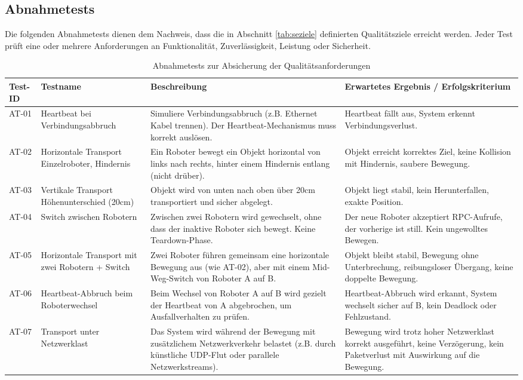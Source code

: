 \subsection{Abnahmetests}

Die folgenden Abnahmetests dienen dem Nachweis, dass die in Abschnitt \ref{tab:seziele} definierten Qualitätsziele erreicht werden. Jeder Test prüft eine oder mehrere Anforderungen an Funktionalität, Zuverlässigkeit, Leistung oder Sicherheit.

\begin{table}[h!]
\centering
\begin{tabular}{p{1.6cm}|p{4cm}|p{5.5cm}|p{5.5cm}}
\hline
\textbf{Test-ID} & \textbf{Testname} & \textbf{Beschreibung} & \textbf{Erwartetes Ergebnis / Erfolgskriterium} \\
\hline
AT-01 & Heartbeat bei Verbindungsabbruch & Simuliere Verbindungsabbruch (z.B. Ethernet Kabel trennen). Der Heartbeat-Mechanismus muss korrekt auslösen. & Heartbeat fällt aus, System erkennt Verbindungsverlust.\\
\hline
AT-02 & Horizontale Transport Einzelroboter, Hindernis & Ein Roboter bewegt ein Objekt horizontal von links nach rechts, hinter einem Hindernis entlang (nicht drüber). & Objekt erreicht korrektes Ziel, keine Kollision mit Hindernis, saubere Bewegung. \\
\hline
AT-03 & Vertikale Transport  Höhenunterschied (20cm) & Objekt wird von unten nach oben über 20cm transportiert und sicher abgelegt. & Objekt liegt stabil, kein Herunterfallen, exakte Position. \\
\hline
AT-04 & Switch zwischen Robotern & Zwischen zwei Robotern wird gewechselt, ohne dass der inaktive Roboter sich bewegt. Keine Teardown-Phase. & Der neue Roboter akzeptiert RPC-Aufrufe, der vorherige ist still. Kein ungewolltes Bewegen. \\
\hline
AT-05 & Horizontale Transport mit zwei Robotern + Switch & Zwei Roboter führen gemeinsam eine horizontale Bewegung aus (wie AT-02), aber mit einem Mid-Weg-Switch von Roboter A auf B. & Objekt bleibt stabil, Bewegung ohne Unterbrechung, reibungsloser Übergang, keine doppelte Bewegung. \\
\hline
AT-06 & Heartbeat-Abbruch beim Roboterwechsel & Beim Wechsel von Roboter A auf B wird gezielt der Heartbeat von A abgebrochen, um Ausfallverhalten zu prüfen. & Heartbeat-Abbruch wird erkannt, System wechselt sicher auf B, kein Deadlock oder Fehlzustand. \\
\hline
AT-07 & Transport unter Netzwerklast & Das System wird während der Bewegung mit zusätzlichem Netzwerkverkehr belastet (z.B. durch künstliche UDP-Flut oder parallele Netzwerkstreams). & Bewegung wird trotz hoher Netzwerklast korrekt ausgeführt, keine Verzögerung, kein Paketverlust mit Auswirkung auf die Bewegung. \\
\hline
\end{tabular}
\caption{Abnahmetests zur Absicherung der Qualitätsanforderungen}
\label{tab:abnahmetests}
\end{table}
